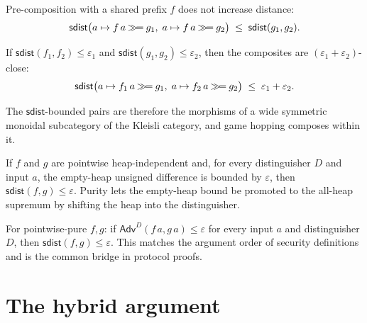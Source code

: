 \begin{theorem}
  \label{thm:sdist-comp-left}
  \leanok
  Pre-composition with a shared prefix $f$ does not increase distance:
  \[
    \mathsf{sdist}\bigl(a \mapsto f\,a \mathbin{\gg\!=} g_1,\; a \mapsto f\,a \mathbin{\gg\!=} g_2\bigr)
      \;\le\; \mathsf{sdist}(g_1, g_2).
  \]
\end{theorem}

\begin{theorem}
  \label{thm:sdist-comp-add}
  \leanok
  If $\mathsf{sdist}(f_1, f_2) \le \varepsilon_1$ and
  $\mathsf{sdist}(g_1, g_2) \le \varepsilon_2$, then the composites are
  $(\varepsilon_1 + \varepsilon_2)$-close:
  \[
    \mathsf{sdist}\bigl(a \mapsto f_1\,a \mathbin{\gg\!=} g_1,\;
      a \mapsto f_2\,a \mathbin{\gg\!=} g_2\bigr) \;\le\; \varepsilon_1 + \varepsilon_2.
  \]
\end{theorem}

The $\mathsf{sdist}$-bounded pairs are therefore the morphisms of a wide symmetric
monoidal subcategory of the Kleisli category, and game hopping composes within it.

\begin{theorem}
  \label{thm:sdist-isPure-le}
  \leanok
  If $f$ and $g$ are pointwise heap-independent and, for every distinguisher $D$
  and input $a$, the empty-heap unsigned difference is bounded by $\varepsilon$,
  then $\mathsf{sdist}(f, g) \le \varepsilon$. Purity lets the empty-heap bound be
  promoted to the all-heap supremum by shifting the heap into the distinguisher.
\end{theorem}

\begin{theorem}
  \label{thm:sdist-of-isPure-advantageA}
  \leanok
  For pointwise-pure $f, g$: if
  $\mathsf{Adv}^D(f\,a, g\,a) \le \varepsilon$ for every input $a$ and distinguisher
  $D$, then $\mathsf{sdist}(f, g) \le \varepsilon$. This matches the argument order
  of security definitions and is the common bridge in protocol proofs.
\end{theorem}

\section{The hybrid argument}

